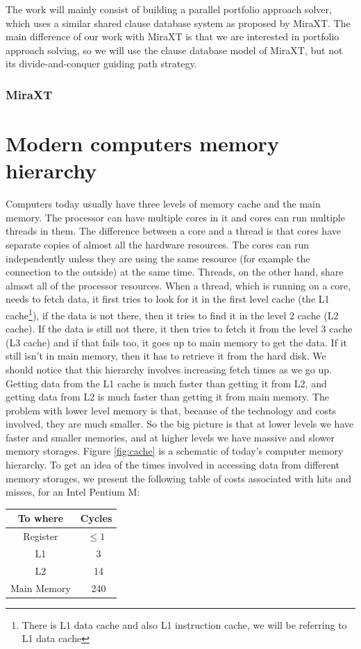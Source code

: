 \documentclass[12pt]{diicc}
\begin{document}
The work will mainly consist of building a parallel portfolio approach solver, which uses a similar shared clause database system as proposed by MiraXT. The main difference of our work with MiraXT is that we are interested in portfolio approach solving, so we will use the clause database model of MiraXT, but not its divide-and-conquer guiding path strategy. 

\subsubsection{MiraXT}

\section{Modern computers memory hierarchy}

Computers today usually have three levels of memory cache and the main memory. The processor can have multiple cores in it and cores can run multiple threads in them. The difference between a core and a thread is that cores have separate copies of almost all the hardware resources. The cores can run independently unless they are using the same resource (for example the connection to the outside) at the same time. Threads, on the other hand, share almost all of the processor resources. When a thread, which is running on a core, needs to fetch data, it first tries to look for it in the first level cache (the L1 cache\footnote{There is L1 data cache and also L1 instruction cache, we will be referring to L1 data cache}), if the data is not there, then it tries to find it in the level 2 cache (L2 cache). If the data is still not there, it then tries to fetch it from the level 3 cache (L3 cache) and if that fails too, it goes up to main memory to get the data. If it still isn't in main memory, then it has to retrieve it from the hard disk. We should notice that this hierarchy involves increasing fetch times as we go up. Getting data from the L1 cache is much faster than getting it from L2, and getting data from L2 is much faster than getting it from main memory. The problem with lower level memory is that, because of the technology and costs involved, they are much smaller. So the big picture is that at lower levels we have faster and smaller memories, and at higher levels we have massive and slower memory storages. Figure \ref{fig:cache} is a schematic of today's computer memory hierarchy. To get an idea of the times involved in accessing data from different memory storages, we present the following table of costs associated with hits and misses, for an Intel Pentium M:
\begin{center}
\begin{tabular}{ c | c }
  To where & Cycles \\ \hline
  Register & $\leq 1$ \\
  L1 & ~3 \\ 
  L2 & ~14 \\
  Main Memory & ~240 \\
\end{tabular}
\end{center}
\end{document}
